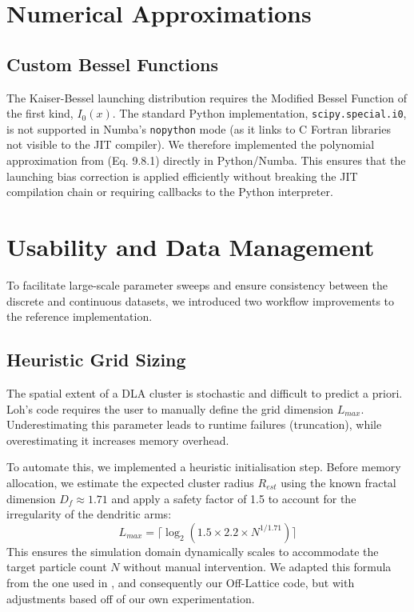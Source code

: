 \documentclass[12pt, a4paper, oneside]{report}
\theoremstyle{remark}
\begin{document}
\begin{algorithm}[H]
\caption{Alias Sampling (Constant Time)}
\end{algorithm}

\section{Numerical Approximations}
\subsection{Custom Bessel Functions}
The Kaiser-Bessel launching distribution requires the Modified Bessel Function of the first kind, $I_0(x)$.
The standard Python implementation, \texttt{scipy.special.i0}, is not supported in Numba's \texttt{nopython} mode (as it links to C Fortran libraries not visible to the JIT compiler).
We therefore implemented the polynomial approximation from \cite{Abramowitz1965} (Eq. 9.8.1) directly in Python/Numba. This ensures that the launching bias correction is applied efficiently without breaking the JIT compilation chain or requiring callbacks to the Python interpreter.

\section{Usability and Data Management}
\label{app:usability}

To facilitate large-scale parameter sweeps and ensure consistency between the discrete and continuous datasets, we introduced two workflow improvements to the reference implementation.

\subsection{Heuristic Grid Sizing}
The spatial extent of a DLA cluster is stochastic and difficult to predict a priori. Loh's code requires the user to manually define the grid dimension $L_{max}$. Underestimating this parameter leads to runtime failures (truncation), while overestimating it increases memory overhead.

To automate this, we implemented a heuristic initialisation step. Before memory allocation, we estimate the expected cluster radius $R_{est}$ using the known fractal dimension $D_f \approx 1.71$ and apply a safety factor of 1.5 to account for the irregularity of the dendritic arms:
\begin{equation}
    L_{max} = \lceil \log_2(1.5 \times 2.2 \times N^{1/1.71}) \rceil
\end{equation}
This ensures the simulation domain dynamically scales to accommodate the target particle count $N$ without manual intervention. We adapted this formula from the one used in \cite{Bell2019}, and consequently our Off-Lattice code, but with adjustments based off of our own experimentation.
\end{document}
